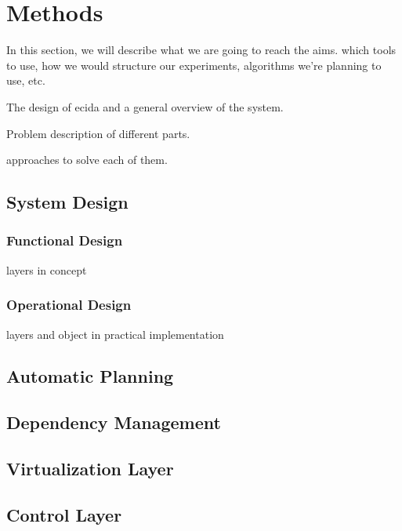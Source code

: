 \section{Methods}
\label{sec:method}
In this section, we will describe what we are going to reach the aims. which tools to use, how we would structure our experiments, algorithms we're planning to use, etc.

The design of ecida and a general overview of the system.

Problem description of different parts.

approaches to solve each of them.

\subsection{System Design}
\subsubsection{Functional Design}
layers in concept
\subsubsection{Operational Design}
layers and object in practical implementation
\subsection{Automatic Planning}

\subsection{Dependency Management }

\subsection{Virtualization Layer}

\subsection{Control Layer}
